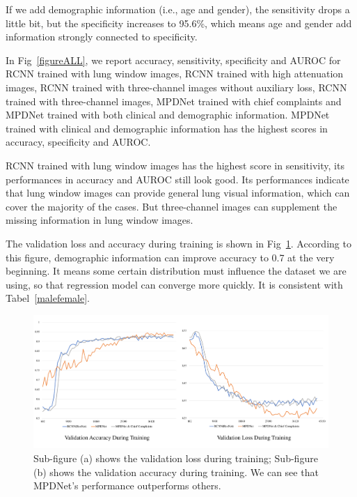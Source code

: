 \documentclass[journal]{IEEEtran}
\begin{document}
If we add demographic information (i.e., age and gender), the sensitivity drops a little bit, but the specificity increases to 95.6\%, which means age and gender add information strongly connected to specificity.

In Fig~\ref{figureALL}, we report accuracy, sensitivity, specificity and AUROC for RCNN trained with lung window images, RCNN trained with high attenuation images, RCNN trained with three-channel images without auxiliary loss, RCNN trained with three-channel images, MPDNet trained with chief complaints and MPDNet trained with both clinical and demographic information. MPDNet trained with clinical and demographic information has the highest scores in accuracy, specificity and AUROC. 

RCNN trained with lung window images has the highest score in sensitivity, its performances in accuracy and AUROC still look good. Its performances indicate that lung window images can provide general lung visual information, which can cover the majority of the cases. But three-channel images can supplement the missing information in lung window images.

The validation loss and accuracy during training is shown in Fig~\ref{loss}. According to this figure, demographic information can improve accuracy to 0.7 at the very beginning. It means some certain distribution must influence the dataset we are using, so that regression model can converge more quickly. It is consistent with Tabel~\ref{malefemale}.

\begin{figure}[htbp]
    \centerline{\includegraphics[width=180mm]{aacloss.pdf}}
    \vspace{-0cm}
    \caption{Sub-figure (a) shows the validation loss during training; Sub-figure (b) shows the validation accuracy during training. We can see that MPDNet's performance outperforms others.}
    \vspace{-0cm}
    \label{loss}

    \end{figure}
\end{document}
